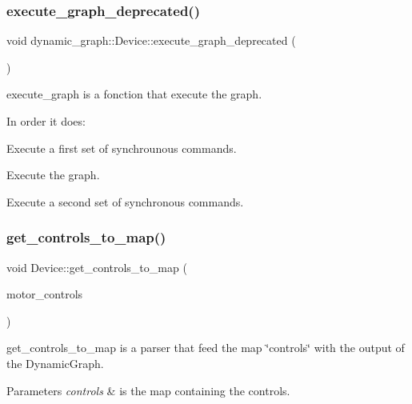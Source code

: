 \subsubsection{\texorpdfstring{execute\+\_\+graph\+\_\+deprecated()}{execute\_graph\_deprecated()}}
{\footnotesize\ttfamily void dynamic\+\_\+graph\+::\+Device\+::execute\+\_\+graph\+\_\+deprecated (\begin{DoxyParamCaption}{ }\end{DoxyParamCaption})\hspace{0.3cm}{\ttfamily [inline]}}



execute\+\_\+graph is a fonction that execute the graph. 

In order it does\+:
\begin{DoxyItemize}
\item Execute a first set of synchrounous commands.
\item Execute the graph.
\item Execute a second set of synchronous commands. 
\end{DoxyItemize}\mbox{\label{classdynamic__graph_1_1Device_a3291a91974c35f03719220e237512aa8}} 
\subsubsection{\texorpdfstring{get\+\_\+controls\+\_\+to\+\_\+map()}{get\_controls\_to\_map()}}
{\footnotesize\ttfamily void Device\+::get\+\_\+controls\+\_\+to\+\_\+map (\begin{DoxyParamCaption}\item[{\hyperlink{namespacedynamic__graph_a51212ed7fa4ae81e7b362a27f09b7ab8}{Vector\+D\+G\+Map} \&}]{motor\+\_\+controls }\end{DoxyParamCaption})\hspace{0.3cm}{\ttfamily [virtual]}}



get\+\_\+controls\+\_\+to\+\_\+map is a parser that feed the map \char`\"{}controls\char`\"{} with the output of the Dynamic\+Graph. 


\begin{DoxyParams}{Parameters}
{\em controls} & is the map containing the controls. \\
\hline
\end{DoxyParams}
\mbox{\label{classdynamic__graph_1_1Device_af0e00dbc756e6191b2f5d6883187c92f}} 
